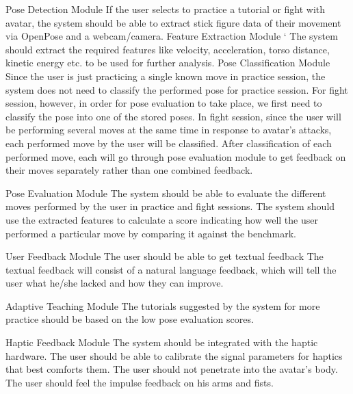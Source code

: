\begin{outline}
 \1 Pose Detection Module
   \2 If the user selects to practice a tutorial or fight with avatar, the system should be able to extract stick figure data of their movement via OpenPose and a webcam/camera.
 \1 Feature Extraction Module
 `\2 The system should extract the required features like velocity, acceleration, torso distance, kinetic energy etc. to be used for further analysis.
 \1 Pose Classification Module
  \2 Since the user is just practicing a single known move in practice session, the system does not need to classify the performed pose for practice session. For fight session, however, in order for pose evaluation to take place, we first need to classify the pose into one of the stored poses.
  \2 In fight session, since the user will be performing several moves at the same time in response to avatar’s attacks, each performed move by the user will be classified. After classification of each performed move, each will go through pose evaluation module to get feedback on their moves separately rather than one combined feedback. 
  
 \1 Pose Evaluation Module
  \2 The system should be able to evaluate the different moves performed by the user in practice and fight sessions.
    \3 The system should use the extracted features to calculate a score indicating how well the user performed a particular move by comparing it against the benchmark.

 \1 User Feedback Module
  \2 The user should be able to get textual feedback 
   \3 The textual feedback will consist of a natural language feedback, which will tell the user what he/she lacked and how they can improve. 

 \1 Adaptive Teaching Module
  \2 The tutorials suggested by the system for more practice should be based on the low pose evaluation scores. 

 \1 Haptic Feedback Module
  \2 The system should be integrated with the haptic hardware.
  \2 The user should be able to calibrate the signal parameters for haptics that best comforts them.
  \2 The user should not penetrate into the avatar’s body.
  \2 The user should feel the impulse feedback on his arms and fists. 
\end{outline}

